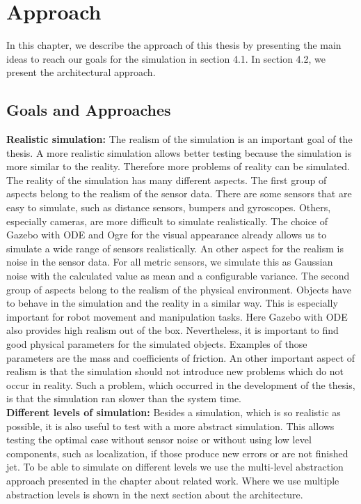 \chapter{Approach}
In this chapter, we describe the approach of this thesis by presenting the main ideas to reach our goals for the simulation in section 4.1. In section 4.2, we present the architectural approach.

\section{Goals and Approaches}
\textbf{Realistic simulation:} The realism of the simulation is an important goal of the thesis. A more realistic simulation allows better testing because the simulation is more similar to the reality. Therefore more problems of reality can be simulated. The reality of the simulation has many different aspects. The first group of aspects belong to the realism of the sensor data. There are some sensors that are easy to simulate, such as distance sensors, bumpers and gyroscopes. Others, especially cameras, are more difficult to simulate realistically. The choice of Gazebo with ODE and Ogre for the visual appearance already allows us to simulate a wide range of sensors realistically. An other aspect for the realism is noise in the sensor data. For all metric sensors, we simulate this as Gaussian noise with the calculated value as mean and a configurable variance. The second group of aspects belong to the realism of the physical environment. Objects have to behave in the simulation and the reality in a similar way. This is especially important for robot movement and manipulation tasks. Here Gazebo with ODE also provides high realism out of the box. Nevertheless, it is important to find good physical parameters for the simulated objects. Examples of those parameters are the mass and coefficients of friction. An other important aspect of realism is that the simulation should not introduce new problems which do not occur in reality. Such a problem, which occurred in the development of the thesis, is that the simulation ran slower than the system time.\\
\textbf{Different levels of simulation:} Besides a simulation, which is so realistic as possible, it is also useful to test with a more abstract simulation. This allows testing the optimal case without sensor noise or without using low level components, such as localization, if those produce new errors or are not finished jet. To be able to simulate on different levels we use the multi-level abstraction approach presented in the chapter about related work. Where we use multiple abstraction levels is shown in the next section about the architecture.\\
